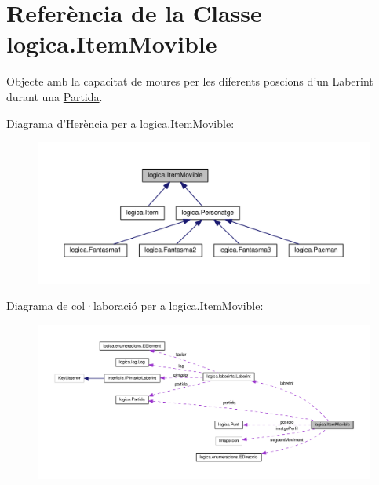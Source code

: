 \hypertarget{classlogica_1_1_item_movible}{\section{Referència de la Classe logica.\+Item\+Movible}
\label{classlogica_1_1_item_movible}
}


Objecte amb la capacitat de moures per les diferents poscions d'un Laberint durant una \hyperlink{classlogica_1_1_partida}{Partida}.  




Diagrama d'Herència per a logica.\+Item\+Movible\+:\nopagebreak
\begin{figure}[H]
\begin{center}
\leavevmode
\includegraphics[width=350pt]{classlogica_1_1_item_movible__inherit__graph}
\end{center}
\end{figure}


Diagrama de col·laboració per a logica.\+Item\+Movible\+:
\nopagebreak
\begin{figure}[H]
\begin{center}
\leavevmode
\includegraphics[width=350pt]{classlogica_1_1_item_movible__coll__graph}
\end{center}
\end{figure}
